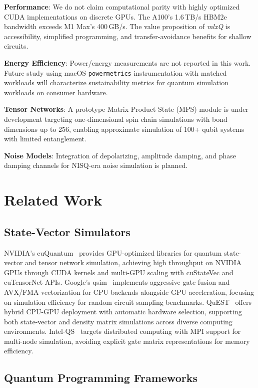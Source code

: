 \documentclass[runningheads]{llncs}
\newcommand{\mlxquantum}{\textit{mlxQ}\xspace}
\begin{document}
\textbf{Performance}: We do not claim computational parity with highly optimized CUDA implementations on discrete GPUs. The A100's 1.6\,TB/s HBM2e bandwidth exceeds M1 Max's 400\,GB/s. The value proposition of \mlxquantum is accessibility, simplified programming, and transfer-avoidance benefits for shallow circuits.

\textbf{Energy Efficiency}: Power/energy measurements are not reported in this work. Future study using macOS \texttt{powermetrics} instrumentation with matched workloads will characterize sustainability metrics for quantum simulation workloads on consumer hardware.

\textbf{Tensor Networks}: A prototype Matrix Product State (MPS) module is under development targeting one-dimensional spin chain simulations with bond dimensions up to 256, enabling approximate simulation of 100+ qubit systems with limited entanglement.

\textbf{Noise Models}: Integration of depolarizing, amplitude damping, and phase damping channels for NISQ-era noise simulation is planned.

\section{Related Work}

\subsection{State-Vector Simulators}

NVIDIA's cuQuantum~\cite{cuQuantum2023} provides GPU-optimized libraries for quantum state-vector and tensor network simulation, achieving high throughput on NVIDIA GPUs through CUDA kernels and multi-GPU scaling with cuStateVec and cuTensorNet APIs. Google's qsim~\cite{Qsim} implements aggressive gate fusion and AVX/FMA vectorization for CPU backends alongside GPU acceleration, focusing on simulation efficiency for random circuit sampling benchmarks. QuEST~\cite{QuEST,Jones2019quest} offers hybrid CPU-GPU deployment with automatic hardware selection, supporting both state-vector and density matrix simulations across diverse computing environments. Intel-QS~\cite{IntelQS} targets distributed computing with MPI support for multi-node simulation, avoiding explicit gate matrix representations for memory efficiency.

\subsection{Quantum Programming Frameworks}
\end{document}
